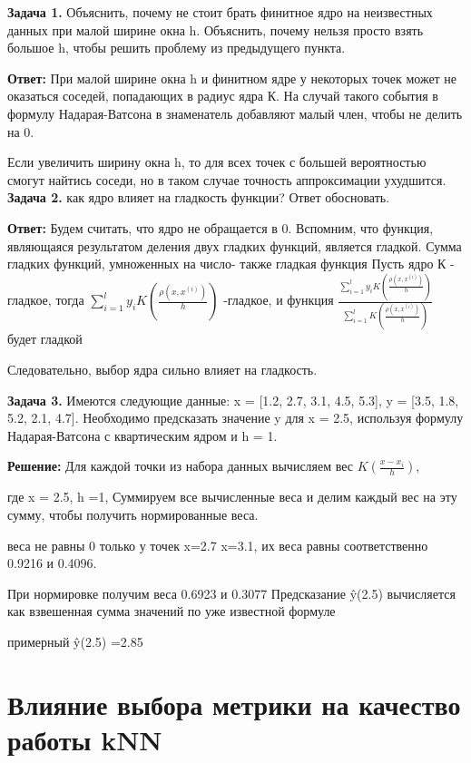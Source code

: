 \textbf{Задача 1.}
Объяснить, почему не стоит брать финитное ядро на неизвестных данных при малой ширине окна h. Объяснить, почему нельзя просто взять большое h, чтобы решить проблему из предыдущего пункта.

\textbf{Ответ:}
При малой ширине окна h и финитном ядре у некоторых точек может не оказаться соседей, попадающих в радиус ядра К. На случай такого события в формулу Надарая-Ватсона в знаменатель добавляют малый член, чтобы не делить на 0.

Если увеличить ширину окна h, то для всех точек с большей вероятностью смогут найтись соседи, но в таком случае точность аппроксимации ухудшится.
\\

\textbf{Задача 2.}  как ядро влияет на гладкость функции? Ответ обосновать.

\textbf{Ответ:}
Будем считать, что ядро не обращается в 0.
Вспомним, что функция, являющаяся результатом деления двух гладких функций, является гладкой.
Сумма гладких функций, умноженных на число- также гладкая функция
Пусть ядро К - гладкое, тогда ${\sum\limits_{i=1}^ly_iK\left(\frac{\rho(x, x^{(i)})}{h}\right)}$ -гладкое, и функция
$\frac{\sum\limits_{i=1}^ly_iK\left(\frac{\rho(x, x^{(i)})}{h}\right)}{\sum\limits_{i=1}^lK\left(\frac{\rho(x, x^{(i)})}{h}\right)}$
будет гладкой

Следовательно, выбор ядра сильно влияет на гладкость.

\textbf{Задача 3.} Имеются следующие данные: x = [1.2, 2.7, 3.1, 4.5, 5.3],  y = [3.5, 1.8, 5.2, 2.1, 4.7].  Необходимо предсказать значение y для x = 2.5, используя формулу Надарая-Ватсона с квартическим ядром и h = 1.


\textbf{Решение:} Для каждой точки из набора данных вычисляем вес $K(\frac{x-x_i}{h})$,

где x = 2.5, h =1,
Суммируем все вычисленные веса и делим каждый вес на эту сумму, чтобы получить нормированные веса.

веса не равны 0 только у точек x=2.7 x=3.1, их веса равны соответственно 0.9216 и 0.4096.

При нормировке получим веса 0.6923 и 0.3077
Предсказание ŷ(2.5) вычисляется как взвешенная сумма значений по уже известной формуле

примерный ŷ(2.5) =2.85


\section{Влияние выбора метрики на качество работы kNN}

